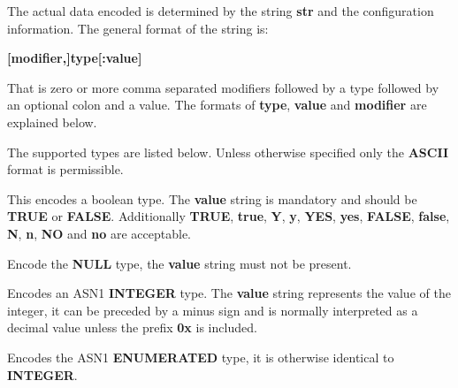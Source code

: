 \documentclass[]{article}
\let\realtextbf=\textbf
\renewcommand{\textbf}[1]{\textcolor{boldcolor}{\realtextbf{#1}}}
\begin{document}
The actual data encoded is determined by the string \textbf{str} and the
configuration information. The general format of the string is:

\begin{description}
\item[\textbf{{[}modifier,{]}type{[}:value{]}}]
\end{description}

That is zero or more comma separated modifiers followed by a type
followed by an optional colon and a value. The formats of \textbf{type},
\textbf{value} and \textbf{modifier} are explained below.


The supported types are listed below. Unless otherwise specified only
the \textbf{ASCII} format is permissible.

\begin{description}
\itemsep1pt\parskip0pt
\item[\textbf{BOOLEAN}, \textbf{BOOL}]
This encodes a boolean type. The \textbf{value} string is mandatory and
should be \textbf{TRUE} or \textbf{FALSE}. Additionally \textbf{TRUE},
\textbf{true}, \textbf{Y}, \textbf{y}, \textbf{YES}, \textbf{yes},
\textbf{FALSE}, \textbf{false}, \textbf{N}, \textbf{n}, \textbf{NO} and
\textbf{no} are acceptable.
\end{description}

\begin{description}
\itemsep1pt\parskip0pt
\item[\textbf{NULL}]
Encode the \textbf{NULL} type, the \textbf{value} string must not be
present.
\end{description}

\begin{description}
\itemsep1pt\parskip0pt
\item[\textbf{INTEGER}, \textbf{INT}]
Encodes an ASN1 \textbf{INTEGER} type. The \textbf{value} string
represents the value of the integer, it can be preceded by a minus sign
and is normally interpreted as a decimal value unless the prefix
\textbf{0x} is included.
\end{description}

\begin{description}
\itemsep1pt\parskip0pt
\item[\textbf{ENUMERATED}, \textbf{ENUM}]
Encodes the ASN1 \textbf{ENUMERATED} type, it is otherwise identical to
\textbf{INTEGER}.
\end{description}
\end{document}
